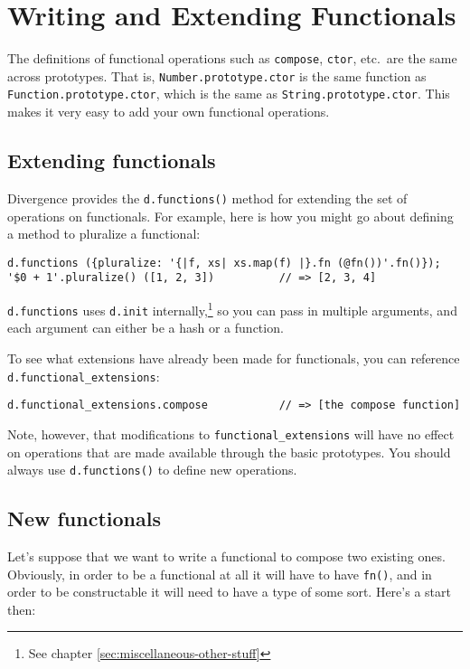 \documentclass{report}
\begin{document}
\chapter {Writing and Extending Functionals}
    \label{sec:writing-and-extending-functionals}

    The definitions of functional operations such as \verb|compose|, \verb|ctor|, etc.~are the same across prototypes. That is, \verb|Number.prototype.ctor| is the same function as
    \verb|Function.prototype.ctor|, which is the same as \verb|String.prototype.ctor|. This makes it very easy to add your own functional operations.

\section {Extending functionals}
      Divergence provides the \verb|d.functions()| method for extending the set of operations on functionals. For example, here is how you might go about defining a method to pluralize a
      functional:

\begin{verbatim}
d.functions ({pluralize: '{|f, xs| xs.map(f) |}.fn (@fn())'.fn()});
'$0 + 1'.pluralize() ([1, 2, 3])          // => [2, 3, 4]
\end{verbatim}

      \verb|d.functions| uses \verb|d.init| internally,\footnote{See chapter \ref{sec:miscellaneous-other-stuff}} so you can pass in multiple arguments, and each argument can either be a hash
      or a function.

      To see what extensions have already been made for functionals, you can reference \verb|d.functional_extensions|:

\begin{verbatim}
d.functional_extensions.compose           // => [the compose function]
\end{verbatim}

      Note, however, that modifications to \verb|functional_extensions| will have no effect on operations that are made available through the basic prototypes. You should always use
      \verb|d.functions()| to define new operations.
    
\section {New functionals}
      Let's suppose that we want to write a functional to compose two existing ones. Obviously, in order to be a functional at all it will have to have \verb|fn()|, and in order to be
      constructable it will need to have a type of some sort. Here's a start then:
\end{document}
